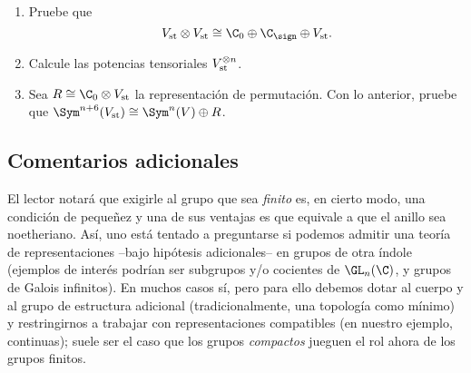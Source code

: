\documentclass[11pt, reqno]{amsart}
\begin{document}
\begin{enumerate}
\begin{enumerate}
			\item Pruebe que
				\[
					V_{\rm st} \otimes V_{\rm st} \cong \C_0 \oplus \C_{\sign} \oplus V_{\rm st}.
				\]

			\item Calcule las potencias tensoriales $V_{\rm st}^{\otimes n}$.

			\item Sea $R \cong \C_0 \otimes V_{\rm st}$ la representación de permutación.
				Con lo anterior, pruebe que $\Sym^{n+6}(V_{\rm st}) \cong \Sym^n(V) \oplus R$.
		\end{enumerate}
\end{enumerate}

\begin{additional}
\appendix
\section{Comentarios adicionales}

El lector notará que exigirle al grupo que sea \emph{finito} es, en cierto modo, una condición de pequeñez y una de sus ventajas es que
equivale a que el anillo sea noetheriano.
Así, uno está tentado a preguntarse si podemos admitir una teoría de representaciones --bajo hipótesis adicionales-- en grupos de otra
índole (ejemplos de interés podrían ser subgrupos y/o cocientes de $\GL_n(\C)$, y grupos de Galois infinitos).
En muchos casos sí, pero para ello debemos dotar al cuerpo y al grupo de estructura adicional (tradicionalmente, una topología como mínimo)
y restringirnos a trabajar con representaciones compatibles (en nuestro ejemplo, continuas); suele ser el caso que los grupos
\emph{compactos} jueguen el rol ahora de los grupos finitos.

\printbibliography
\end{additional}
\end{document}
